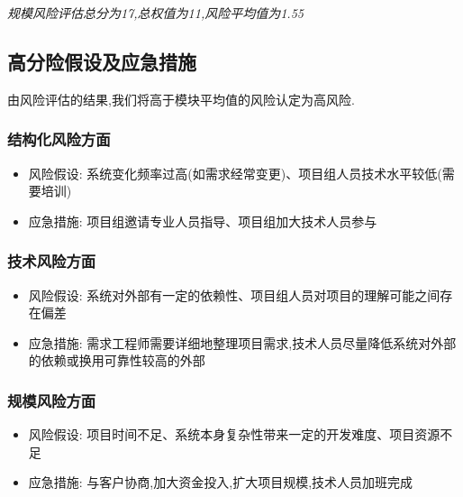 \documentclass[hyperref, a4paper]{ctexart}
\providecommand{\tightlist}{%
  \setlength{\itemsep}{0pt}\setlength{\parskip}{0pt}}
\begin{document}
\emph{规模风险评估总分为17,总权值为11,风险平均值为1.55}

\hypertarget{ux9ad8ux5206ux9669ux5047ux8bbeux53caux5e94ux6025ux63aaux65bd}{%
\subsection{高分险假设及应急措施}\label{ux9ad8ux5206ux9669ux5047ux8bbeux53caux5e94ux6025ux63aaux65bd}}

由风险评估的结果,我们将高于模块平均值的风险认定为高风险.

\hypertarget{ux7ed3ux6784ux5316ux98ceux9669ux65b9ux9762}{%
\subsubsection{结构化风险方面}\label{ux7ed3ux6784ux5316ux98ceux9669ux65b9ux9762}}

\begin{itemize}
\tightlist
\item
  风险假设:
  系统变化频率过高(如需求经常变更)、项目组人员技术水平较低(需要培训)
\item
  应急措施: 项目组邀请专业人员指导、项目组加大技术人员参与
\end{itemize}

\hypertarget{ux6280ux672fux98ceux9669ux65b9ux9762}{%
\subsubsection{技术风险方面}\label{ux6280ux672fux98ceux9669ux65b9ux9762}}

\begin{itemize}
\tightlist
\item
  风险假设:
  系统对外部有一定的依赖性、项目组人员对项目的理解可能之间存在偏差
\item
  应急措施:
  需求工程师需要详细地整理项目需求,技术人员尽量降低系统对外部的依赖或换用可靠性较高的外部
\end{itemize}

\hypertarget{ux89c4ux6a21ux98ceux9669ux65b9ux9762}{%
\subsubsection{规模风险方面}\label{ux89c4ux6a21ux98ceux9669ux65b9ux9762}}

\begin{itemize}
\tightlist
\item
  风险假设: 项目时间不足、系统本身复杂性带来一定的开发难度、项目资源不足
\item
  应急措施: 与客户协商,加大资金投入,扩大项目规模,技术人员加班完成
\end{itemize}
\end{document}
